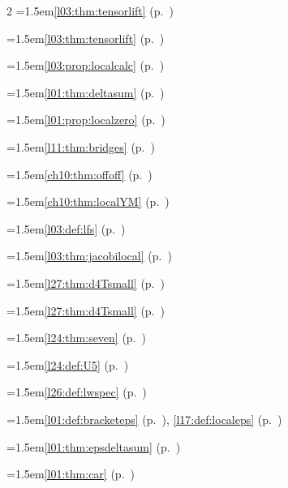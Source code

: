 \begin{multicols}{2}
\hangindent=1.5em\quad \ref{l03:thm:tensorlift} (p.~\pageref{l03:thm:tensorlift})\par
\hangindent=1.5em\quad \ref{l03:thm:tensorlift} (p.~\pageref{l03:thm:tensorlift})\par
\hangindent=1.5em\quad \ref{l03:prop:localcalc} (p.~\pageref{l03:prop:localcalc})\par
\hangindent=1.5em\quad \ref{l01:thm:deltasum} (p.~\pageref{l01:thm:deltasum})\par
\hangindent=1.5em\quad \ref{l01:prop:localzero} (p.~\pageref{l01:prop:localzero})\par
\hangindent=1.5em\quad \ref{l11:thm:bridges} (p.~\pageref{l11:thm:bridges})\par
\hangindent=1.5em\quad \ref{ch10:thm:offoff} (p.~\pageref{ch10:thm:offoff})\par
\hangindent=1.5em\quad \ref{ch10:thm:localYM} (p.~\pageref{ch10:thm:localYM})\par
\hangindent=1.5em\quad \ref{l03:def:lfs} (p.~\pageref{l03:def:lfs})\par
\hangindent=1.5em\quad \ref{l03:thm:jacobilocal} (p.~\pageref{l03:thm:jacobilocal})\par
\hangindent=1.5em\quad \ref{l27:thm:d4Tsmall} (p.~\pageref{l27:thm:d4Tsmall})\par
\hangindent=1.5em\quad \ref{l27:thm:d4Tsmall} (p.~\pageref{l27:thm:d4Tsmall})\par
\hangindent=1.5em\quad \ref{l24:thm:seven} (p.~\pageref{l24:thm:seven})\par
\hangindent=1.5em\quad \ref{l24:def:U5} (p.~\pageref{l24:def:U5})\par
\hangindent=1.5em\quad \ref{l26:def:lwspec} (p.~\pageref{l26:def:lwspec})\par
\hangindent=1.5em\quad \ref{l01:def:bracketeps} (p.~\pageref{l01:def:bracketeps}), \ref{l17:def:localeps} (p.~\pageref{l17:def:localeps})\par
\hangindent=1.5em\quad \ref{l01:thm:epsdeltasum} (p.~\pageref{l01:thm:epsdeltasum})\par
\hangindent=1.5em\quad \ref{l01:thm:car} (p.~\pageref{l01:thm:car})\par

\end{multicols}
